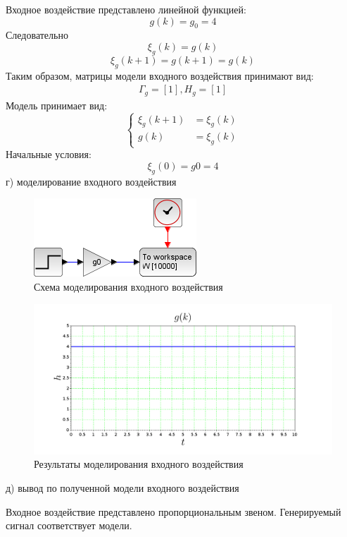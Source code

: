 \documentclass[a4paper,14pt]{extreport}
\begin{document}
Входное воздействие представлено линейной функцией:
\begin{equation}
	g(k) = g_0 = 4
\end{equation}
Следовательно
\begin{equation}
\xi_g(k) = g(k)
\end{equation}
\begin{equation}
\xi_g(k+1) = g(k+1) = g(k)
\end{equation}
Таким образом, матрицы модели входного воздействия принимают вид:
\begin{align}
	\Gamma_g = [1], H_g = [1]
\end{align}
Модель принимает вид:
\begin{equation}
	\begin{cases}
	\xi_g(k+1) &= \xi_g(k)\\
	g(k) &= \xi_g (k)
	\end{cases}
\end{equation}
Начальные условия: 
\begin{equation}
	\xi_g(0) = g0 = 4
\end{equation}
г) моделирование входного воздействия
\begin{figure}[H]
	\center\includegraphics[width=0.4\linewidth]{gk.png}
	\caption{Схема моделирования входного воздействия}
	\label{fig:scr1}
\end{figure}
\begin{figure}[H]
	\center\includegraphics[width=0.7\linewidth]{gk_res.png}
	\caption{Результаты моделирования входного воздействия}
	\label{fig:scr1}
\end{figure}

д) вывод по полученной модели входного воздействия

Входное воздействие представлено пропорциональным звеном. Генерируемый сигнал соответствует модели.
\end{document}
